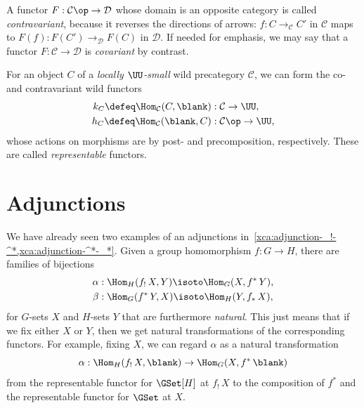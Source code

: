 A functor $F : \mathcal C\op \to \mathcal D$ whose domain is an opposite
category is called \emph{contravariant}, because it reverses the directions
of arrows: $f : C \to_{\mathcal C} C'$ in $\mathcal C$ maps to
$F(f) : F(C') \to_{\mathcal D} F(C)$ in $\mathcal D$.
If needed for emphasis, we may say that a functor
$F : \mathcal C \to \mathcal D$ is \emph{covariant} by contrast.

\begin{example}\label{ex:repr-functors}
  For an object $C$ of a \emph{locally $\UU$-small}
  wild precategory $\mathcal C$, we can form the
  co-
  and contravariant wild
  functors
  \begin{align*}
    k_C \defeq \Hom_{\mathcal C}(C, \blank) &: \mathcal C \to \UU, \\
    h_C \defeq \Hom_{\mathcal C}(\blank, C) &: \mathcal C\op \to \UU,
  \end{align*}
  whose actions on morphisms
  are by post- and precomposition, respectively.
  These are called \emph{representable} functors.
\end{example}

\section{Adjunctions}
\label{sec:adjunctions}

We have already seen two examples of an adjunctions
in~\cref{xca:adjunction-_!-^*,xca:adjunction-^*-_*}.
Given a group homomorphism $f : G \to H$,
there are families of bijections
\begin{align*}
  \alpha &: \Hom_H(f_!\,X,Y) \isoto \Hom_G(X,f^*\,Y), \\
  \beta &: \Hom_G(f^*\,Y,X) \isoto \Hom_H(Y,f_*\,X),
\end{align*}
for $G$-sets $X$ and $H$-sets $Y$
that are furthermore \emph{natural}.
This just means that if we fix either $X$ or $Y$,
then we get natural transformations of the corresponding functors.
For example,
fixing $X$, we can regard $\alpha$ as a natural transformation
\[
  \alpha : \Hom_H(f_!\,X, \blank) \to \Hom_G(X, f^*\,\blank)
\]
from the representable functor for $\GSet[H]$ at $f_!\,X$
to the composition of $f^*$ and the representable functor
for $\GSet$ at $X$.

